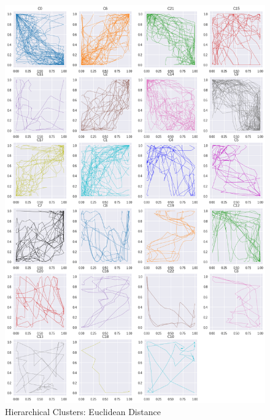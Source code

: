 \begin{figure}[h]
  \centering
  \includegraphics[width=\linewidth,height=\textheight,keepaspectratio]{figs/clusters/CLU_H_ALL[Ed].png}
  \caption{ Hierarchical Clusters: Euclidean Distance}
\end{figure}

